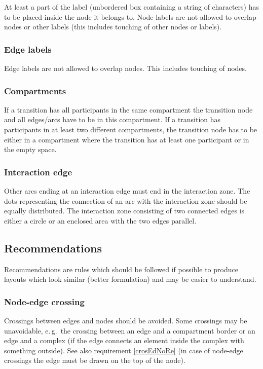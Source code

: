 At least a part of the label (unbordered box containing a string of
characters) has to be placed inside the node it belongs to. Node
labels are not allowed to overlap nodes or other labels (this
includes touching of other nodes or labels).

\subsubsection{Edge labels}

Edge labels are not allowed to overlap nodes. This includes touching
of nodes.

\subsubsection{Compartments}

If a transition has all participants in the same compartment the
transition node and all edges/arcs have to be in this compartment.
If a transition has participants in at least two different
compartments, the transition node has to be either in a compartment
where the transition has at least one participant or in the empty
space.

\subsubsection{Interaction edge}

Other arcs ending at an interaction edge must end in the interaction
zone. The dots representing the connection of an arc with the
interaction zone should be equally distributed. The interaction zone
consisting of two connected edges is either a circle or an enclosed
area with the two edges parallel.

\newpage
\subsection{Recommendations}

Recommendations are rules which should be followed if possible to
produce layouts which look similar (better formulation) and may be
easier to understand.

\subsubsection{Node-edge crossing}\label{crosEdNo}

Crossings between edges and nodes should be avoided. Some crossings
may be unavoidable, e.\,g.~the crossing between an edge and a
compartment border or an edge and a complex (if the edge connects an
element inside the complex with something outside). See also
requirement \ref{crosEdNoRe} (in case of node-edge crossings the
edge must be drawn on the top of the node).

